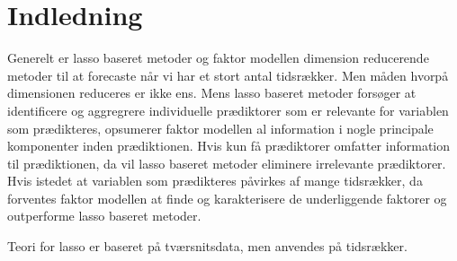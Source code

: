 \chapter{Indledning}



Generelt er lasso baseret metoder og faktor modellen dimension reducerende metoder til at forecaste når vi har et stort antal tidsrækker.
Men måden hvorpå dimensionen reduceres er ikke ens.
Mens lasso baseret metoder forsøger at identificere og aggregrere individuelle prædiktorer som er relevante for variablen som prædikteres, opsumerer faktor modellen al information i nogle principale komponenter inden prædiktionen.
Hvis kun få prædiktorer omfatter information til prædiktionen, da vil lasso baseret metoder eliminere irrelevante prædiktorer.
Hvis istedet at variablen som prædikteres påvirkes af mange tidsrækker, da forventes faktor modellen at finde og karakterisere de underliggende faktorer og outperforme lasso baseret metoder.


Teori for lasso er baseret på tværsnitsdata, men anvendes på tidsrækker.
